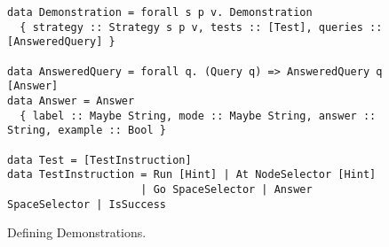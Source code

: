 \begin{figure}
\begin{lcodebox}
\begin{lstlisting}[style=haskell]
data Demonstration = forall s p v. Demonstration
  { strategy :: Strategy s p v, tests :: [Test], queries :: [AnsweredQuery] }

data AnsweredQuery = forall q. (Query q) => AnsweredQuery q [Answer]
data Answer = Answer
  { label :: Maybe String, mode :: Maybe String, answer :: String, example :: Bool }

data Test = [TestInstruction]
data TestInstruction = Run [Hint] | At NodeSelector [Hint]
                     | Go SpaceSelector | Answer SpaceSelector | IsSuccess
\end{lstlisting}
\end{lcodebox}
\vspace{-0.2cm}
\caption{Defining Demonstrations.}\label{fig:demo-def}
\end{figure}
